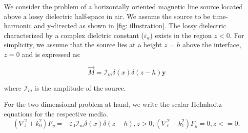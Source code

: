 \documentclass{article}
\begin{document}
We consider the problem of a horizontally oriented magnetic line source located above a lossy dielectric half-space in air. We assume the source to be time-harmonic and y-directed as shown in \ref{fig: illustration}. The lossy dielectric characterized by a complex dielctric constant ($\varepsilon_a$) exists in the region $z < 0$. For simplicity, we assume that the source lies at a height $z = h$ above the interface, $z = 0$ and is expressed as:

\begin{equation}
  \overrightarrow{M} = \mathcal{I}_m \delta(x) \delta(z -h) \mathbf{y}
  \label{Current}
\end{equation}

where $\mathcal{I}_m$ is the amplitude of the source.

For the two-dimensional problem at hand, we write the scalar Helmholtz equations for the respective media.
\begin{subequations}
  \begin{equation}

    \left( \nabla_t^2 + k_0^2 \right) F_y = -\varepsilon_0 \mathcal{I}_m \delta(x) \delta(z -h), z > 0,
    \label{eq:potential_lower}

  \end{equation}

  \begin{equation}

    \left( \nabla_t^2 + k_1^2 \right) F_y = 0, z <= 0,
    \label{eq:potential_lower}

  \end{equation}
\end{subequations}

  
\end{document}

